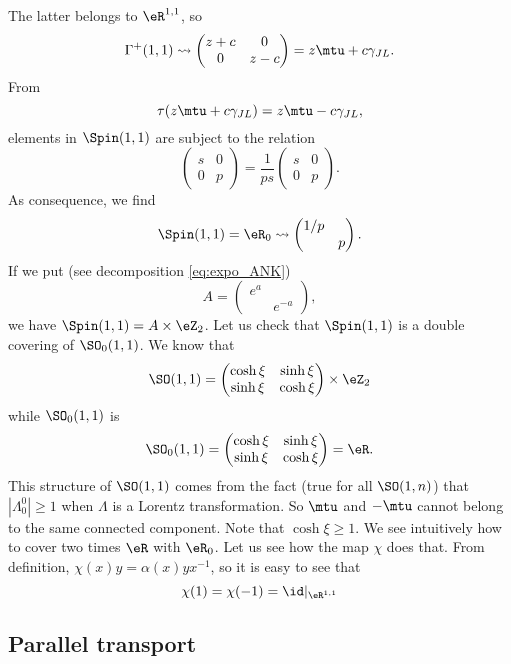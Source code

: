 The latter belongs to $\eR^{1,1}$, so
\[ 
  \Gamma^+(1,1)\leadsto\begin{pmatrix}
z+c&0\\0&z-c
\end{pmatrix}=z\mtu+c\gamma_{JL}.
\]
From 
\[ 
  \tau(z\mtu+c\gamma_{JL})=z\mtu-c\gamma_{JL},
\]
elements in $\Spin(1,1)$ are subject to the relation
\[ 
  \begin{pmatrix}
s&0\\0&p
\end{pmatrix}=
\frac{1}{ ps }\begin{pmatrix}
s&0\\0&p
\end{pmatrix}.
\]
As consequence, we find
\begin{equation}
\Spin(1,1)=\eR_0\leadsto
\begin{pmatrix}
1/p\\&p
\end{pmatrix}.
\end{equation}
 If we put (see decomposition \eqref{eq:expo_ANK})
\[ 
  A=\begin{pmatrix}
 e^{a}\\& e^{-a}
\end{pmatrix},
\]
we have $\Spin(1,1)=A\times\eZ_2$. Let us check that $\Spin(1,1)$ is a double covering of $\SO_0(1,1)$. We know that 
\[ 
  \SO(1,1)=\begin{pmatrix}
\cosh\xi&\sinh\xi\\\sinh\xi&\cosh\xi
\end{pmatrix}\times\eZ_2
\]
while $\SO_0(1,1)$ is 
\[ 
  \SO_0(1,1)=\begin{pmatrix}
\cosh\xi&\sinh\xi\\\sinh\xi&\cosh\xi
\end{pmatrix}=\eR.
\]
This structure of $\SO(1,1)$ comes from the fact (true for all $\SO(1,n)$) that $| \Lambda^0_0 |\geq1$ when $\Lambda$ is a Lorentz transformation. So $\mtu$ and $-\mtu$ cannot belong to the same connected component. Note that $\cosh\xi\geq 1$.
We see intuitively how to cover two times $\eR$ with $\eR_0$. Let us see how the map $\chi$ does that. From definition, $\chi(x)y=\alpha(x)yx^{-1}$, so it is easy to see that 
\[ 
  \chi(1)=\chi(-1)=\id|_{\eR^{1,1}}
\]

\subsection{Parallel transport}

